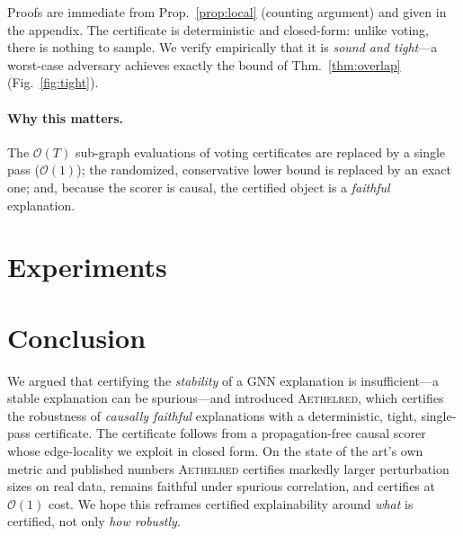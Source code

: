 \documentclass[letterpaper]{article}
\newcommand{\aeth}{\textsc{Aethelred}}
\newcommand{\bigO}{\mathcal{O}}
\begin{document}
\noindent Proofs are immediate from Prop.~\ref{prop:local} (counting argument)
and given in the appendix. The certificate is deterministic and closed-form:
unlike voting, there is nothing to sample. We verify empirically that it is
\emph{sound and tight}---a worst-case adversary achieves exactly the bound of
Thm.~\ref{thm:overlap} (Fig.~\ref{fig:tight}).

\paragraph{Why this matters.}
The $\bigO(T)$ sub-graph evaluations of voting certificates are replaced by a
single pass ($\bigO(1)$); the randomized, conservative lower bound is replaced by
an exact one; and, because the scorer is causal, the certified object is a
\emph{faithful} explanation.

\section{Experiments}
\label{sec:exp}


\section{Conclusion}
\label{sec:concl}
We argued that certifying the \emph{stability} of a GNN explanation is
insufficient---a stable explanation can be spurious---and introduced \aeth{},
which certifies the robustness of \emph{causally faithful} explanations with a
deterministic, tight, single-pass certificate. The certificate follows from a
propagation-free causal scorer whose edge-locality we exploit in closed form. On
the state of the art's own metric and published numbers \aeth{} certifies
markedly larger perturbation sizes on real data, remains faithful under spurious
correlation, and certifies at $\bigO(1)$ cost. We hope this reframes certified
explainability around \emph{what} is certified, not only \emph{how robustly}.



\appendix

\end{document}
